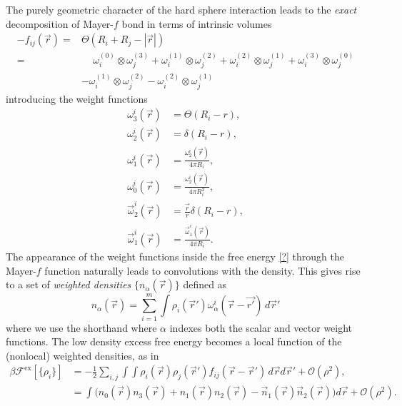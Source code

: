 The purely geometric character of the hard sphere interaction leads to the \emph{exact} decomposition of Mayer-$f$ bond in terms of intrinsic volumes
\begin{equation*}
  \begin{split}
    -f_{ij}(\vec{r})
    =&
    \Theta(R_i + R_j - |\vec{r}|)
    \\ =& \quad\,
    \omega_i^{(0)} \otimes \omega_j^{(3)}
    + \omega_i^{(1)} \otimes \omega_j^{(2)}
    + \omega_i^{(2)} \otimes \omega_j^{(1)}
    + \omega_i^{(3)} \otimes \omega_j^{(0)}
    \\ &
    - \omega_i^{(1)} \otimes \omega_j^{(2)}
    - \omega_i^{(2)} \otimes \omega_j^{(1)}
  \end{split}
\end{equation*}
introducing the weight functions
\begin{subequations}
  \begin{align}
    \omega_3^i(\vec{r})
    &=
    \Theta(R_i - r), \\
    \omega_2^i(\vec{r})
    &=
    \delta(R_i - r), \\
    \omega_1^i(\vec{r})
    &=
    \frac{\omega_2^i(\vec{r})}{4\pi R_i}, \\
    \omega_0^i(\vec{r})
    &=
    \frac{\omega_2^i(\vec{r})}{4\pi R_i^2},
    \\
    \vec{\omega}_2^i(\vec{r})
    &=
    \frac{\vec{r}}{r} \delta(R_i - r),
    \\
    \vec{\omega}_1^i(\vec{r})
    &=
    \frac{\vec{\omega}_1^i(\vec{r})}{4\pi R_i}.
  \end{align}
\end{subequations}
The appearance of the weight functions inside the free energy \eqref{?} through the Mayer-$f$ function naturally leads to convolutions with the density.
This gives rise to a set of \emph{weighted densities} $\{n_\alpha(\vec{r})\}$ defined as \cite{RosenfeldPRL1989,PercusJSP1988}
\begin{equation}
  n_\alpha(\vec{r})
  =
  \sum_{i=1}^m \int
  \rho_i(\vec{r}') \omega_\alpha^i(\vec{r} - \vec{r'})
  \, d\vec{r}'
\end{equation}
where we use the shorthand where $\alpha$ indexes both the scalar and vector weight functions.
The low density excess free energy becomes a local function of the (nonlocal) weighted densities, as in
\begin{equation*}
  \begin{split}
    \beta \mathcal{F}^\mathrm{ex}[\{\rho_i\}]
    &=
    - \frac{1}{2} \sum_{i,j} \int \int
    \rho_i(\vec{r}) \rho_j(\vec{r}') f_{ij}(\vec{r} - \vec{r}')
    \, d\vec{r} d\vec{r}'
    + \mathcal{O}(\rho^2),
    \\ &=
    \int \Big(
    n_0(\vec{r}) n_3(\vec{r})
    + n_1(\vec{r}) n_2(\vec{r})
    - \vec{n}_1(\vec{r}) \vec{n}_2(\vec{r})
    \Big) d\vec{r}
    + \mathcal{O}(\rho^2).
  \end{split}
\end{equation*}
